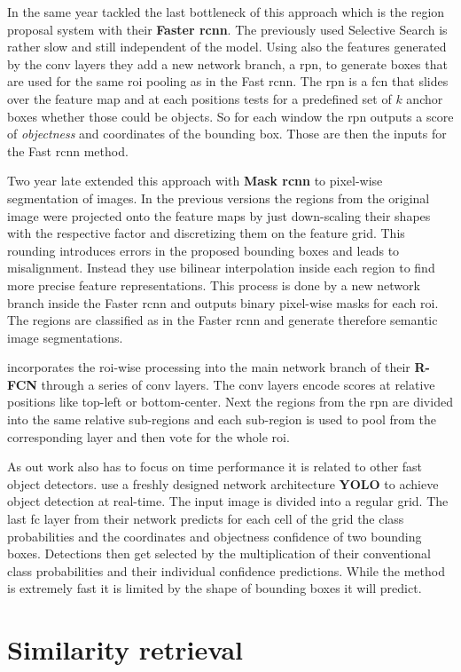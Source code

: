 In the same year \citet{ren_faster_2015} tackled the last bottleneck of this approach which is the region proposal system with their \textbf{Faster \gls{rcnn}}. The previously used Selective Search is rather slow and still independent of the model. Using also the features generated by the \gls{conv} layers they add a new network branch, a \gls{rpn}, to generate boxes that are used for the same \gls{roi} pooling as in the Fast \gls{rcnn}. The \gls{rpn} is a \gls{fcn} that slides over the feature map and at each positions tests for a predefined set of $k$ anchor boxes whether those could be objects. So for each window the \gls{rpn} outputs a score of \textit{objectness} and coordinates of the bounding box. Those are then the inputs for the Fast \gls{rcnn} method.

Two year late \citet{he_mask_2017} extended this approach with \textbf{Mask \gls{rcnn}} to pixel-wise segmentation of images. In the previous versions the regions from the original image were projected onto the feature maps by just down-scaling their shapes with the respective factor and discretizing them on the feature grid. This rounding introduces errors in the proposed bounding boxes and leads to misalignment. Instead they use bilinear interpolation inside each region to find more precise feature representations. This process is done by a new network branch inside the Faster \gls{rcnn} and outputs binary pixel-wise masks for each \gls{roi}. The regions are classified as in the Faster \gls{rcnn} and generate therefore semantic image segmentations.

\citet{dai_r-fcn:_2016} incorporates the \gls{roi}-wise processing into the main network branch of their \textbf{R-FCN} through a series of \gls{conv} layers. The \gls{conv} layers encode scores at relative positions like top-left or bottom-center. Next the regions from the \gls{rpn} are divided into the same relative sub-regions and each sub-region is used to pool from the corresponding layer and then vote for the whole \gls{roi}.

As out work also has to focus on time performance it is related to other fast object detectors. \citet{redmon_you_2016} use a freshly designed network architecture \textbf{YOLO} to achieve object detection at real-time. The input image is divided into a regular grid. The last \gls{fc} layer from their network predicts for each cell of the grid the class probabilities and the coordinates and objectness confidence of two bounding boxes. Detections then get selected by the multiplication of their conventional class probabilities and their individual confidence predictions. While the method is extremely fast it is limited by the shape of bounding boxes it will predict.

\section{Similarity retrieval}
\label{sec:related:retrieval}
\begin{my_list}
    \item \citet{wang_learning_2014}
    \item \citet{chen_visual-based_2015}
\end{my_list}
